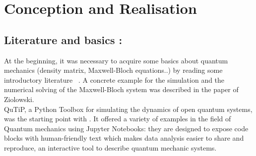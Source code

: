 \chapter{Conception and Realisation}
\label{chapter:conception}

\section{Literature and basics :}
At the beginning, it was necessary to acquire some basics about quantum mechanics (density matrix, Maxwell-Bloch equations..) by reading some introductory literature ~\cite{bastard1992}. A concrete example for the simulation and the numerical solving of the Maxwell-Bloch system was described in the paper of Ziolowski.\\
QuTiP, a Python Toolbox for simulating the dynamics of open quantum systems, was the starting point with . It offered a variety of examples in the field of Quantum mechanics using Jupyter Notebooks: they are designed to expose code blocks with human-friendly text which makes data analysis easier to share and reproduce, an interactive tool to describe quantum mechanic systems.\\
